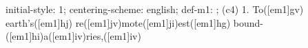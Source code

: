 initial-style: 1;
centering-scheme: english;
def-m1: \grealign;
(c4) 1. To([em1]gv) earth's([em1]hj) re([em1]jv)mote([em1]ji)est([em1]hg) bound-([em1]hi)a([em1]iv)ries,([em1]iv)